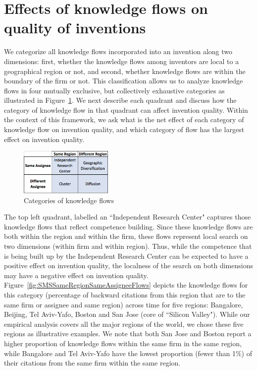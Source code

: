 \documentclass[12pt,letterpaper]{article}
\begin{document}
\section*{Effects of knowledge flows on quality of inventions}
We categorize all knowledge flows incorporated into an invention along two dimensions:  first, whether the knowledge flows among inventors are local to a geographical region or not, and second, whether knowledge flows are within the boundary of the firm or not. This classification allows us to analyze knowledge flows in four mutually exclusive, but collectively exhaustive categories as illustrated in Figure~\ref{fig:2x2}. We next describe each quadrant and discuss how the category of knowledge flow in that quadrant can affect invention quality. Within the context of this framework, we ask what is the net effect of each category of knowledge flow on invention quality, and which category of flow has the largest effect on invention quality. \par
\begin{figure}[h!]
\begin{centering}
  \includegraphics[width=0.4\textwidth]{2x2}
  \caption{Categories of knowledge flows}
  \label{fig:2x2}
\end{centering}
\end{figure}



The top left quadrant, labelled an ``Independent Research Center" captures those knowledge flows that reflect competence building. Since these knowledge flows  are both within the region and within the firm, these flows represent local search on two dimensions (within firm and within region).  Thus, while the competence that is being built up by the Independent Research Center can be expected to have a positive effect on invention quality, the localness of the search on both dimensions may have a negative effect on invention quality. Figure~\ref{fig:SMSSameRegionSameAssigneeFlows} depicts the knowledge flows for this category (percentage of backward citations from this region that are to the same firm or assignee and same region) across time for five regions: Bangalore, Beijing, Tel Aviv-Yafo, Boston and San Jose (core of ``Silicon Valley"). While our empirical analysis covers all the major regions of the world, we chose these five regions as illustrative examples. We note that both San Jose and Boston report a higher proportion of knowledge flows within the same firm in the same region, while Bangalore and Tel Aviv-Yafo have the lowest proportion (fewer than 1\%) of their citations from the same firm within the same region. \par
\end{document}
